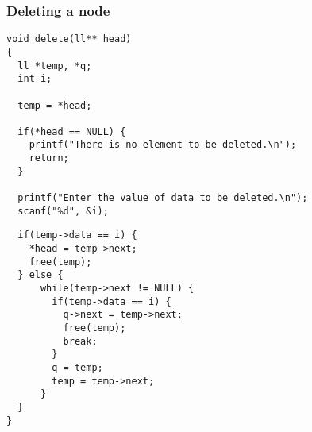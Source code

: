 \documentclass[aspectratio=1610]{beamer}
\begin{document}
\begin{frame}[fragile]
\frametitle{Deleting a node}
\begin{verbatim}
void delete(ll** head)
{
  ll *temp, *q;
  int i;

  temp = *head;

  if(*head == NULL) {
    printf("There is no element to be deleted.\n");
    return;
  }

  printf("Enter the value of data to be deleted.\n");
  scanf("%d", &i);
\end{verbatim}
\end{frame}

\begin{frame}[fragile]
\begin{verbatim}
  if(temp->data == i) {
    *head = temp->next;
    free(temp);
  } else {
      while(temp->next != NULL) {
        if(temp->data == i) {
          q->next = temp->next;
          free(temp);
          break;
        }
        q = temp;
        temp = temp->next;
      }
  }
}
\end{verbatim}
\end{frame}
\end{document}
